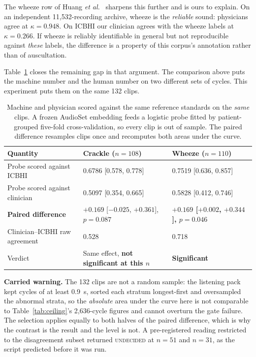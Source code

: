 \documentclass[journal,onecolumn]{IEEEtran}
\newcommand{\best}[1]{\textbf{#1}}
\begin{document}
The wheeze row of Huang \emph{et al.}~\cite{huang2024crackles} sharpens this
further and is ours to explain. On an independent 11{,}532-recording archive,
wheeze is the \emph{reliable} sound: physicians agree at $\kappa=0.948$. On ICBHI
our clinician agrees with the wheeze labels at $\kappa=0.266$. If wheeze is
reliably identifiable in general but not reproducible against \emph{these} labels,
the difference is a property of this corpus's annotation rather than of
auscultation.

Table~\ref{tab:sameclips} closes the remaining gap in that argument. The
comparison above puts the machine number and the human number on two different
sets of cycles. This experiment puts them on the same 132 clips.

\begin{table}[!t]
\centering
\caption{Machine and physician scored against the same reference standards on the
\emph{same} clips. A frozen AudioSet embedding feeds a logistic probe fitted by
patient-grouped five-fold cross-validation, so every clip is out of sample. The
paired difference resamples clips once and recomputes both areas under the curve.}
\label{tab:sameclips}
\small
\begin{tabular}{lll}
\toprule
Quantity & Crackle ($n=108$) & Wheeze ($n=110$) \\
\midrule
Probe scored against ICBHI      & 0.6786 [0.578, 0.778] & 0.7519 [0.636, 0.857] \\
Probe scored against clinician  & 0.5097 [0.354, 0.665] & 0.5828 [0.412, 0.746] \\
\best{Paired difference}        & $+0.169$ [$-0.025$, $+0.361$], $p=0.087$ & \best{$+0.169$ [$+0.002$, $+0.344$], $p=0.046$} \\
Clinician--ICBHI raw agreement  & 0.528 & 0.718 \\
\midrule
Verdict & Same effect, \best{not significant at this $n$} & \best{Significant} \\
\bottomrule
\end{tabular}

\vspace{2pt}
\footnotesize \textbf{Carried warning.} The 132 clips are not a random sample: the
listening pack kept cycles of at least 0.9~s, sorted each stratum longest-first
and oversampled the abnormal strata, so the \emph{absolute} area under the curve
here is not comparable to Table~\ref{tab:ceiling}'s 2{,}636-cycle figures and
cannot overturn the gate failure. The selection applies equally to both halves of
the paired difference, which is why the contrast is the result and the level is
not. A pre-registered reading restricted to the disagreement subset returned
\textsc{undecided} at $n=51$ and $n=31$, as the script predicted before it was run.
\end{table}
\end{document}
